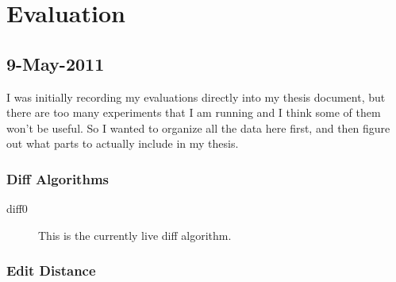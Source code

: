 \section{Evaluation}

\subsection{9-May-2011}

I was initially recording my evaluations directly into my thesis
document, but there are too many experiments that I am running
and I think some of them won't be useful.
So I wanted to organize all the data here first, and then
figure out what parts to actually include in my thesis.

\subsubsection{Diff Algorithms}

\begin{description}
\item[diff0] This is the currently live diff algorithm.
\end{description}

\subsubsection{Edit Distance}

